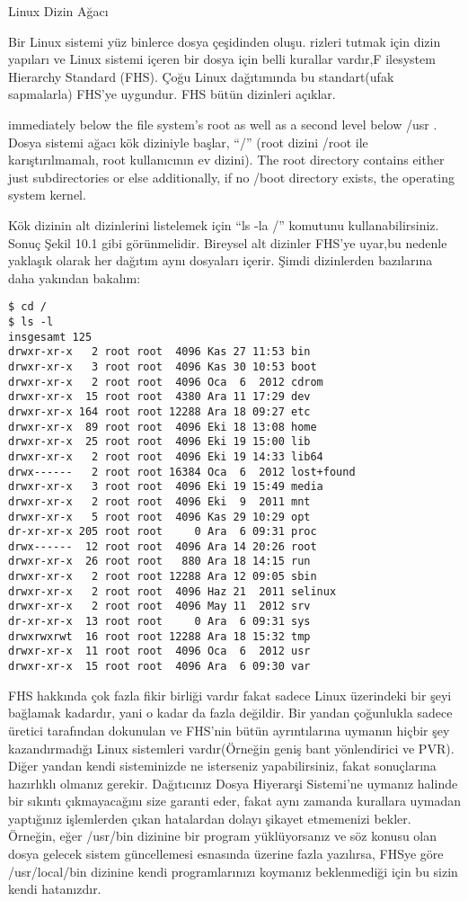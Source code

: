 \begin{section}{Linux Dizin Ağacı}

Bir Linux sistemi yüz binlerce dosya çeşidinden oluşu. rizleri tutmak için dizin yapıları ve Linux sistemi içeren bir dosya için belli kurallar vardır,F ilesystem Hierarchy Standard (FHS). Çoğu Linux dağıtımında bu standart(ufak sapmalarla) FHS'ye uygundur. FHS bütün dizinleri açıklar.

immediately below the file system’s root as well as a second level below /usr .
Dosya sistemi ağacı kök diziniyle başlar, “/” (root dizini /root ile karıştırılmamalı, root kullanıcının ev dizini). The root directory contains either just subdirectories or else additionally, if no /boot directory exists, the operating system kernel. 

Kök dizinin alt dizinlerini listelemek için “ls -la /” komutunu kullanabilirsiniz. Sonuç Şekil 10.1 gibi görünmelidir. Bireysel alt dizinler FHS'ye uyar,bu nedenle yaklaşık olarak her dağıtım aynı dosyaları içerir. Şimdi dizinlerden bazılarına daha yakından bakalım:
\begin{verbatim}
$ cd / 
$ ls -l 
insgesamt 125 
drwxr-xr-x   2 root root  4096 Kas 27 11:53 bin
drwxr-xr-x   3 root root  4096 Kas 30 10:53 boot
drwxr-xr-x   2 root root  4096 Oca  6  2012 cdrom
drwxr-xr-x  15 root root  4380 Ara 11 17:29 dev
drwxr-xr-x 164 root root 12288 Ara 18 09:27 etc
drwxr-xr-x  89 root root  4096 Eki 18 13:08 home
drwxr-xr-x  25 root root  4096 Eki 19 15:00 lib
drwxr-xr-x   2 root root  4096 Eki 19 14:33 lib64
drwx------   2 root root 16384 Oca  6  2012 lost+found
drwxr-xr-x   3 root root  4096 Eki 19 15:49 media
drwxr-xr-x   2 root root  4096 Eki  9  2011 mnt
drwxr-xr-x   5 root root  4096 Kas 29 10:29 opt
dr-xr-xr-x 205 root root     0 Ara  6 09:31 proc
drwx------  12 root root  4096 Ara 14 20:26 root
drwxr-xr-x  26 root root   880 Ara 18 14:15 run
drwxr-xr-x   2 root root 12288 Ara 12 09:05 sbin
drwxr-xr-x   2 root root  4096 Haz 21  2011 selinux
drwxr-xr-x   2 root root  4096 May 11  2012 srv
dr-xr-xr-x  13 root root     0 Ara  6 09:31 sys
drwxrwxrwt  16 root root 12288 Ara 18 15:32 tmp
drwxr-xr-x  11 root root  4096 Oca  6  2012 usr
drwxr-xr-x  15 root root  4096 Ara  6 09:30 var
\end{verbatim}

FHS hakkında çok fazla fikir birliği vardır fakat sadece Linux üzerindeki bir şeyi bağlamak kadardır, yani o kadar da fazla değildir. Bir yandan çoğunlukla sadece üretici tarafından dokunulan ve FHS’nin bütün ayrıntılarına uymanın hiçbir şey kazandırmadığı Linux sistemleri vardır(Örneğin geniş bant yönlendirici ve PVR). Diğer yandan kendi sisteminizde ne isterseniz yapabilirsiniz, fakat sonuçlarına hazırlıklı olmanız gerekir. Dağıtıcınız Dosya Hiyerarşi Sistemi’ne uymanız halinde bir sıkıntı çıkmayacağını size garanti eder, fakat aynı zamanda kurallara uymadan yaptığınız işlemlerden çıkan hatalardan dolayı şikayet etmemenizi bekler. Örneğin, eğer /usr/bin dizinine bir program yüklüyorsanız ve söz konusu olan dosya gelecek sistem güncellemesi esnasında üzerine fazla yazılırsa, FHSye göre /usr/local/bin dizinine kendi programlarınızı koymanız beklenmediği için bu sizin kendi hatanızdır.


\end{section}
